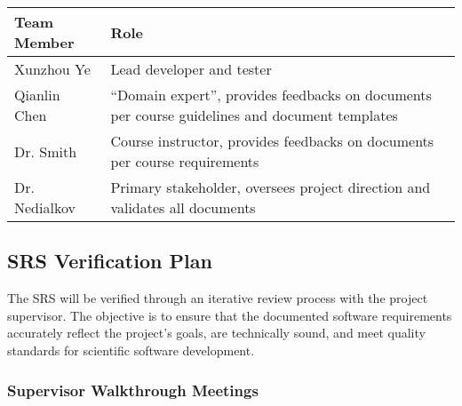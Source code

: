 \documentclass[12pt, titlepage]{article}
\begin{document}
\begin{tabularx}{\linewidth}{lX}
  \toprule
  \textbf{Team Member} & \textbf{Role}                           \\
  \midrule
  Xunzhou Ye     & Lead developer and tester         \\
  Qianlin Chen   & ``Domain expert'', provides feedbacks on documents per course
                   guidelines and document templates \\
  Dr. Smith      & Course instructor, provides feedbacks on documents per course
                   requirements                      \\
  Dr. Nedialkov  & Primary stakeholder, oversees project direction and validates
                   all documents                     \\
  \bottomrule
\end{tabularx}





\subsection{SRS Verification Plan}

The SRS will be verified through an iterative review process with the project
supervisor. The objective is to ensure that the documented software requirements
accurately reflect the project’s goals, are technically sound, and meet quality
standards for scientific software development.

\subsubsection{Supervisor Walkthrough Meetings}
\label{sec:walkthroughmeeting}
\end{document}
